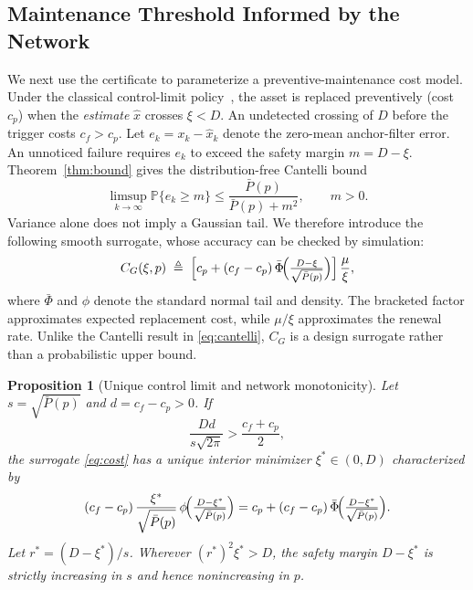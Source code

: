 \documentclass[journal]{IEEEtran}
\newtheorem{proposition}{Proposition}
\newcommand{\Prob}{\mathbb{P}}
\newcommand{\Pb}{\bar{P}}
\begin{document}
\subsection{Maintenance Threshold Informed by the Network}
We next use the certificate to parameterize a preventive-maintenance cost
model. Under the classical control-limit policy~\cite{yang2024tr}, the asset is
replaced preventively (cost $c_p$) when the \emph{estimate} $\hat x$ crosses
$\xi<D$. An undetected crossing of $D$ before the trigger costs
$c_f>c_p$. Let $e_k=x_k-\hat x_k$ denote the zero-mean anchor-filter error.
An unnoticed failure requires $e_k$ to exceed the safety margin $m=D-\xi$.
Theorem~\ref{thm:bound} gives the distribution-free Cantelli bound
\begin{equation}\label{eq:cantelli}
\limsup_{k\to\infty}\Prob\{e_k\geq m\}
\leq \frac{\Pb(p)}{\Pb(p)+m^2},\qquad m>0.
\end{equation}
Variance alone does not imply a Gaussian tail. We therefore introduce the
following smooth surrogate, whose accuracy can be checked by simulation:
\begin{equation}\label{eq:cost}
C_G(\xi,p)\;\triangleq\;\Bigl[c_p+(c_f-c_p)\,
\bar\Phi\!\Bigl(\tfrac{D-\xi}{\sqrt{\Pb(p)}}\Bigr)\Bigr]\,
\frac{\mu}{\xi},
\end{equation}
where $\bar\Phi$ and $\phi$ denote the standard normal tail and density. The
bracketed factor approximates expected replacement cost, while $\mu/\xi$
approximates the renewal rate. Unlike the Cantelli result in
\eqref{eq:cantelli}, $C_G$ is a design surrogate rather than a probabilistic
upper bound.

\begin{proposition}[Unique control limit and network monotonicity]\label{prop:threshold}
Let $s=\sqrt{\Pb(p)}$ and $d=c_f-c_p>0$. If
\begin{equation}\label{eq:interiorcondition}
\frac{Dd}{s\sqrt{2\pi}}>\frac{c_f+c_p}{2},
\end{equation}
the surrogate \eqref{eq:cost} has a unique interior minimizer
$\xi^{*}\in(0,D)$ characterized by
\begin{equation}\label{eq:foc}
(c_f-c_p)\,\frac{\xi^{*}}{\sqrt{\Pb(p)}}\,
\phi\!\Bigl(\tfrac{D-\xi^{*}}{\sqrt{\Pb(p)}}\Bigr)
= c_p+(c_f-c_p)\,\bar\Phi\!\Bigl(\tfrac{D-\xi^{*}}{\sqrt{\Pb(p)}}\Bigr).
\end{equation}
Let $r^*=(D-\xi^*)/s$. Wherever $(r^*)^2\xi^*>D$, the safety margin
$D-\xi^*$ is strictly increasing in $s$ and hence nonincreasing in $p$.
\end{proposition}
\end{document}

